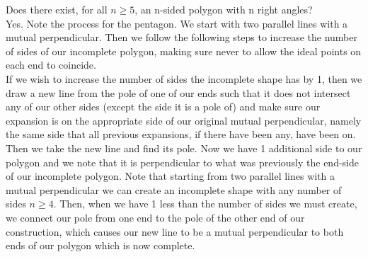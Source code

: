 \documentclass[12pt,letterpaper]{article}
\begin{document}
\newpage

\noindent Does there exist, for all $n \geq 5$, an n-sided polygon with n right angles?  \\

Yes.  Note the process for the pentagon.  We start with two parallel lines with a mutual perpendicular.  Then we follow the following steps to increase the number of sides of our incomplete polygon, making sure never to allow the ideal points on each end to coincide.\\

If we wish to increase the number of sides the incomplete shape has by 1, then we draw a new line from the pole of one of our ends such that it does not intersect any of our other sides (except the side it is a pole of) and make sure our expansion is on the appropriate side of our original mutual perpendicular, namely the same side that all previous expansions, if there have been any, have been on.  Then we take the new line and find its pole.  Now we have 1 additional side to our polygon and we note that it is perpendicular to what was previously the end-side of our incomplete polygon.  Note that starting from two parallel lines with a mutual perpendicular we can create an incomplete shape with any number of sides $n \geq 4$.  Then, when we have 1 less than the number of sides we must create, we connect our pole from one end to the pole of the other end of our construction, which causes our new line to be a mutual perpendicular to both ends of our polygon which is now complete.
\end{document}
